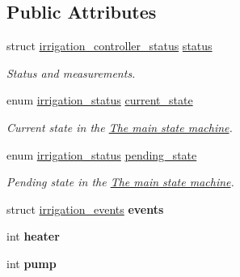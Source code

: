 \subsection*{Public Attributes}
\begin{DoxyCompactItemize}
\item 
struct \hyperlink{structirrigation__controller__status}{irrigation\+\_\+controller\+\_\+status} \hyperlink{structirrigation__controller_a68a854df15c9234d24f2ad36b990bfa8}{status}
\begin{DoxyCompactList}\small\item\em Status and measurements. \end{DoxyCompactList}\item 
enum \hyperlink{irrigation_8h_ac40bd72ec6942e213e454ebcacc92dc7}{irrigation\+\_\+status} \hyperlink{structirrigation__controller_a80bec16de2d6f98564ed1487dee041c5}{current\+\_\+state}
\begin{DoxyCompactList}\small\item\em Current state in the \hyperlink{group__state__machine}{The main state machine}. \end{DoxyCompactList}\item 
enum \hyperlink{irrigation_8h_ac40bd72ec6942e213e454ebcacc92dc7}{irrigation\+\_\+status} \hyperlink{structirrigation__controller_a7e1c5689983d2b8aae434c2d5442c935}{pending\+\_\+state}
\begin{DoxyCompactList}\small\item\em Pending state in the \hyperlink{group__state__machine}{The main state machine}. \end{DoxyCompactList}\item 
\hypertarget{structirrigation__controller_a4ae62413005c2121bee0ac25a0119cbc}{}struct \hyperlink{structirrigation__events}{irrigation\+\_\+events} {\bfseries events}\label{structirrigation__controller_a4ae62413005c2121bee0ac25a0119cbc}

\item 
\hypertarget{structirrigation__controller_a94cb4b4c26de9f40543f06335afa036c}{}int {\bfseries heater}\label{structirrigation__controller_a94cb4b4c26de9f40543f06335afa036c}

\item 
\hypertarget{structirrigation__controller_a38217da0082898392465f4ee2901f73b}{}int {\bfseries pump}\label{structirrigation__controller_a38217da0082898392465f4ee2901f73b}

\end{DoxyCompactItemize}


